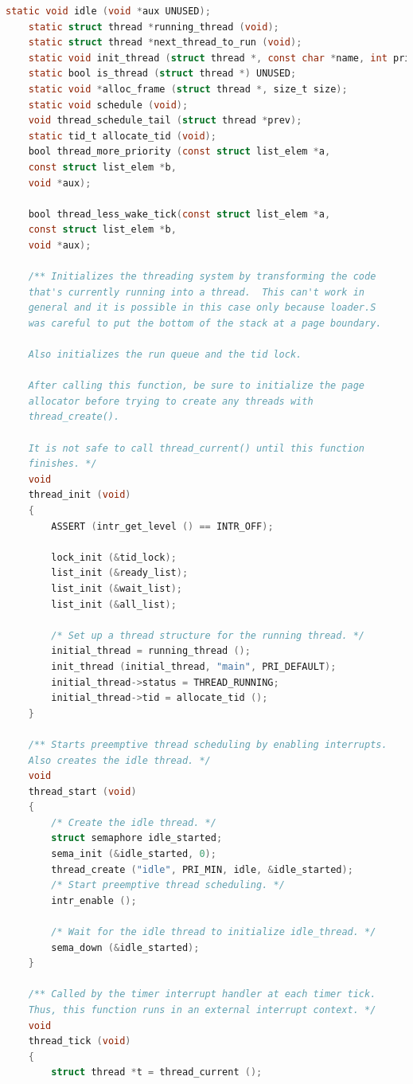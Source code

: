 \documentclass{article}
\begin{document}
\begin{lstlisting}[language=C, title=\texttt{pintos/src/threads/thread.c}]
	static void idle (void *aux UNUSED);
	static struct thread *running_thread (void);
	static struct thread *next_thread_to_run (void);
	static void init_thread (struct thread *, const char *name, int priority);
	static bool is_thread (struct thread *) UNUSED;
	static void *alloc_frame (struct thread *, size_t size);
	static void schedule (void);
	void thread_schedule_tail (struct thread *prev);
	static tid_t allocate_tid (void);
	bool thread_more_priority (const struct list_elem *a,
	const struct list_elem *b,
	void *aux);
	
	bool thread_less_wake_tick(const struct list_elem *a,
	const struct list_elem *b,
	void *aux);
	
	/** Initializes the threading system by transforming the code
	that's currently running into a thread.  This can't work in
	general and it is possible in this case only because loader.S
	was careful to put the bottom of the stack at a page boundary.
	
	Also initializes the run queue and the tid lock.
	
	After calling this function, be sure to initialize the page
	allocator before trying to create any threads with
	thread_create().
	
	It is not safe to call thread_current() until this function
	finishes. */
	void
	thread_init (void) 
	{
		ASSERT (intr_get_level () == INTR_OFF);
		
		lock_init (&tid_lock);
		list_init (&ready_list);
		list_init (&wait_list);
		list_init (&all_list);
		
		/* Set up a thread structure for the running thread. */
		initial_thread = running_thread ();
		init_thread (initial_thread, "main", PRI_DEFAULT);
		initial_thread->status = THREAD_RUNNING;
		initial_thread->tid = allocate_tid ();
	}
	
	/** Starts preemptive thread scheduling by enabling interrupts.
	Also creates the idle thread. */
	void
	thread_start (void) 
	{
		/* Create the idle thread. */
		struct semaphore idle_started;
		sema_init (&idle_started, 0);
		thread_create ("idle", PRI_MIN, idle, &idle_started);
		/* Start preemptive thread scheduling. */
		intr_enable ();
		
		/* Wait for the idle thread to initialize idle_thread. */
		sema_down (&idle_started);
	}
	
	/** Called by the timer interrupt handler at each timer tick.
	Thus, this function runs in an external interrupt context. */
	void
	thread_tick (void) 
	{
		struct thread *t = thread_current ();
		

\end{lstlisting}
\end{document}
